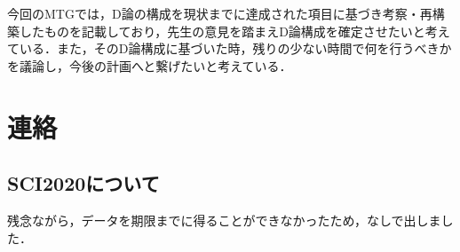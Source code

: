\documentclass[16pt]{jsarticle}
\begin{document}
		
	\articleSPRobj
		今回のMTGでは，D論の構成を現状までに達成された項目に基づき考察・再構築したものを記載しており，先生の意見を踏まえD論構成を確定させたいと考えている．また，そのD論構成に基づいた時，残りの少ない時間で何を行うべきかを議論し，今後の計画へと繋げたいと考えている．
		

	\articleSPRitemsone
		
		\tableofcontents
		
		
	\articleSPRitemstwo
	\renewcommand{\labelitemi}{$\blacktriangledown$}
	\newcommand{\argmax}{\mathop{\rm arg~max}\limits}
	\newcommand{\argmin}{\mathop{\rm arg~min}\limits}
	\newcommand{\Ker}{{\rm Ker}}
	\newcommand{\rank}{{\rm rank}}
	\section{連絡}
		\subsection*{SCI2020について}
			残念ながら，データを期限までに得ることができなかったため，なしで出しました．
\end{document}
